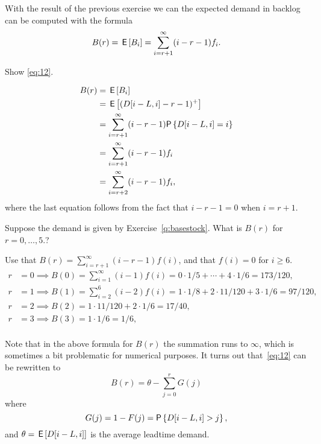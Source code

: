 With the result of the previous exercise we can  the expected demand in backlog can be computed with the formula
  \begin{equation}  \label{eq:12}
     B(r) = \,\mathsf{E}\left[B_i\right] =\sum_{i=r+1}^\infty (i- r -1)f_i.
  \end{equation}

\begin{exercise}
Show \eqref{eq:12}. 
  \begin{solution}
\begin{align*}
     B(r) 
   &= \E{B_i} \\
   &= \E{( D[i-L, i]- r - 1)^+} \\
   &= \sum_{i=r+1}^\infty (i- r -1)\P{D[i-L, i] = i}\\
   &= \sum_{i=r+1}^\infty (i- r -1)f_i \\
   &= \sum_{i=r+2}^\infty (i- r -1)f_i,
\end{align*}
where the last equation follows from the fact that $i-r-1=0$ when $i=r+1$.
  \end{solution}
\end{exercise}

\begin{exercise}\label{q:basestock_B}
  Suppose the demand is given by  Exercise~\ref{q:basestock}. What is $B(r)$ for $r=0,\ldots, 5$.?
\begin{solution}
  Use that $B(r) = \sum_{i=r+1}^\infty (i-r-1)f(i)$, and that $f(i)=0$ for $i\geq 6$.
  \begin{align*}
    r&=0 \implies B(0) = \sum_{i=1}^\infty (i-1)f(i) =  0\cdot 1/5 + \cdots + 4 \cdot 1/6 = 173/120, \\
    r&=1 \implies B(1) = \sum_{i=2}^6 (i-2)f(i) =  1\cdot 1/8 + 2\cdot 11/120 + 3 \cdot 1/6 = 97/120, \\
    r&=2 \implies B(2) = 1\cdot 11/120 + 2 \cdot 1/6 = 17/40, \\
    r&=3 \implies B(3) = 1 \cdot 1/6 = 1/6, \\
  \end{align*}
\end{solution}
\end{exercise}

Note that in the above formula for $B(r)$ the summation runs to $\infty$, which is sometimes a bit problematic for numerical purposes. It turns out that~\eqref{eq:12} can be rewritten to 
\begin{equation} \label{eq:17}
   B(r) = \theta - \sum_{j=0}^{r} G(j)
\end{equation}
where
\begin{equation*}
    G(j) = 1 - F(j) = \P{D[i-L, i] > j},
\end{equation*}
and $\theta=\,\mathsf{E}\left[D[i-L, i]\right]$ is the average leadtime demand.

